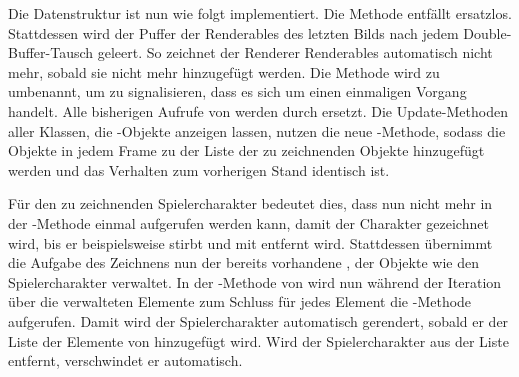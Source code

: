 Die Datenstruktur ist nun wie folgt implementiert. Die Methode  entfällt ersatzlos. Stattdessen wird der Puffer der Renderables des letzten Bilds nach jedem  Double-Buffer-Tausch geleert. So zeichnet der Renderer Renderables automatisch nicht mehr, sobald sie nicht mehr hinzugefügt werden. Die Methode  wird zu  umbenannt, um zu signalisieren, dass es sich um einen einmaligen Vorgang handelt. Alle bisherigen Aufrufe von  werden durch  ersetzt. Die Update-Methoden aller Klassen, die \classRenderable{}-Objekte anzeigen lassen, nutzen die neue -Methode, sodass die Objekte in jedem Frame zu der Liste der zu zeichnenden Objekte hinzugefügt werden und das Verhalten zum vorherigen Stand identisch ist.

\begin{example}
	Für den zu zeichnenden Spielercharakter bedeutet dies, dass nun nicht mehr in der -Methode einmal  aufgerufen werden kann, damit der Charakter gezeichnet wird, bis er beispielsweise stirbt und mit  entfernt wird. Stattdessen übernimmt die Aufgabe des Zeichnens nun der bereits vorhandene \classEntityManager{}, der Objekte wie den Spielercharakter verwaltet. In der -Methode von \classEntityManager{} wird nun während der Iteration über die verwalteten Elemente zum Schluss für jedes Element die -Methode aufgerufen. Damit wird der Spielercharakter automatisch gerendert, sobald er der Liste der Elemente von \classEntityManager{} hinzugefügt wird. Wird der Spielercharakter aus der Liste entfernt, verschwindet er automatisch.
\end{example}

